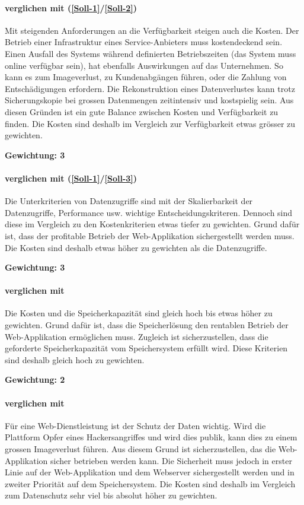 \paragraph*{ verglichen mit  (\ref{Soll-1}/\ref{Soll-2})} 
Mit steigenden Anforderungen an die Verfügbarkeit steigen auch die Kosten. Der Betrieb einer Infrastruktur eines Service-Anbieters muss kostendeckend sein. Einen Ausfall des Systems während definierten Betriebszeiten (das System muss online verfügbar sein), hat ebenfalls Auswirkungen auf das Unternehmen. So kann es zum Imageverlust, zu Kundenabgängen führen, oder die Zahlung von Entschädigungen erfordern. Die Rekonstruktion eines Datenverlustes kann trotz Sicherungskopie bei grossen Datenmengen zeitintensiv und kostspielig sein. Aus diesen Gründen ist ein gute Balance zwischen Kosten und Verfügbarkeit zu finden. Die Kosten sind deshalb im Vergleich zur Verfügbarkeit etwas grösser zu gewichten.

\textbf{Gewichtung: 3}

\paragraph*{ verglichen mit  (\ref{Soll-1}/\ref{Soll-3})}
Die Unterkriterien von Datenzugriffe sind mit der Skalierbarkeit der Datenzugriffe, Performance usw. wichtige Entscheidungskriteren. Dennoch sind diese im Vergleich zu den Kostenkriterien etwas tiefer zu gewichten. Grund dafür ist, dass der profitable Betrieb der Web-Applikation sichergestellt werden muss. Die Kosten sind deshalb etwas höher zu gewichten als die Datenzugriffe.

\textbf{Gewichtung: 3}

\paragraph*{ verglichen mit }
Die Kosten und die Speicherkapazität sind gleich hoch bis etwas höher zu gewichten. Grund dafür ist, dass die Speicherlösung den rentablen Betrieb der Web-Applikation ermöglichen muss. Zugleich ist sicherzustellen, dass die geforderte Speicherkapazität vom Speichersystem erfüllt wird. Diese Kriterien sind deshalb gleich hoch zu gewichten.

\textbf{Gewichtung: 2}

\paragraph*{ verglichen mit }
Für eine Web-Dienstleistung ist der Schutz der Daten wichtig. Wird die Plattform Opfer eines Hackersangriffes und wird dies publik, kann dies zu einem grossen Imageverlust führen. Aus diesem Grund ist sicherzustellen, das die Web-Applikation sicher betrieben werden kann. Die Sicherheit muss jedoch in erster Linie auf der Web-Applikation und dem Webserver sichergestellt werden und in zweiter Priorität auf dem Speichersystem. Die Kosten sind deshalb im Vergleich zum Datenschutz sehr viel bis absolut höher zu gewichten.

